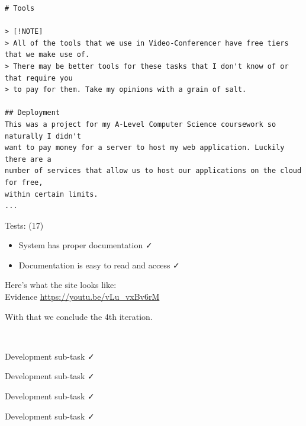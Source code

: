 \begin{verbatim}
# Tools

> [!NOTE]
> All of the tools that we use in Video-Conferencer have free tiers that we make use of.
> There may be better tools for these tasks that I don't know of or that require you
> to pay for them. Take my opinions with a grain of salt.

## Deployment
This was a project for my A-Level Computer Science coursework so naturally I didn't
want to pay money for a server to host my web application. Luckily there are a
number of services that allow us to host our applications on the cloud for free,
within certain limits.
...
\end{verbatim}

{\sffamily Tests: (17)}

\begin{itemize}
  \item System has proper documentation \faCheck
  \item Documentation is easy to read and access \faCheck
\end{itemize}

Here's what the site looks like: \\ \vspace{0.2cm}
{\sffamily Evidence}  \url{https://youtu.be/vLu_vxBv6rM} \\ \vspace{0.2cm}

With that we conclude the 4th iteration. \\ \vspace{0.2cm}

{\color{gray} \hrulefill} \\ \vspace{0.2cm}

{\sffamily Development sub-task } \faCheck \\ \vspace{0.2cm}

{\sffamily Development sub-task } \faCheck \\ \vspace{0.2cm}

{\sffamily Development sub-task } \faCheck \\ \vspace{0.2cm}

{\sffamily Development sub-task } \faCheck \\ \vspace{0.2cm}

